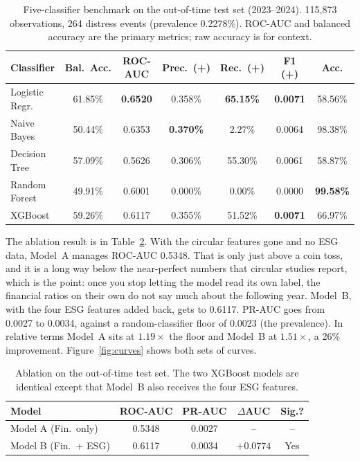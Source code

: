 \documentclass[conference]{IEEEtran}
\begin{document}
\begin{table}[t]
\caption{Five-classifier benchmark on the out-of-time test set (2023--2024).
115{,}873 observations, 264 distress events (prevalence 0.2278\%). ROC-AUC and
balanced accuracy are the primary metrics; raw accuracy is for context.}
\label{tab:bench}
\centering
\renewcommand{\arraystretch}{1.2}
\setlength{\tabcolsep}{4pt}
\begin{tabular}{lcccccc}
\toprule
Classifier & Bal.\ Acc. & ROC-AUC & Prec.\ (+) & Rec.\ (+) & F1 (+) & Acc. \\
\midrule
Logistic Regr.\ & 61.85\% & \textbf{0.6520} & 0.358\% & \textbf{65.15\%} & \textbf{0.0071} & 58.56\% \\
Naive Bayes     & 50.44\% & 0.6353 & \textbf{0.370\%} & 2.27\%  & 0.0064 & 98.38\% \\
Decision Tree   & 57.09\% & 0.5626 & 0.306\% & 55.30\% & 0.0061 & 58.87\% \\
Random Forest   & 49.91\% & 0.6001 & 0.000\% & 0.00\%  & 0.0000 & \textbf{99.58\%} \\
XGBoost         & 59.26\% & 0.6117 & 0.355\% & 51.52\% & \textbf{0.0071} & 66.97\% \\
\bottomrule
\end{tabular}
\end{table}

The ablation result is in Table~\ref{tab:ablation}. With the circular features
gone and no ESG data, Model~A manages ROC-AUC 0.5348. That is only just above a
coin toss, and it is a long way below the near-perfect numbers that circular
studies report, which is the point: once you stop letting the model read its own
label, the financial ratios on their own do not say much about the following
year. Model~B, with the four ESG features added back, gets to 0.6117. PR-AUC goes
from 0.0027 to 0.0034, against a random-classifier floor of 0.0023 (the
prevalence). In relative terms Model~A sits at $1.19\times$ the floor and
Model~B at $1.51\times$, a 26\% improvement. Figure~\ref{fig:curves} shows both
sets of curves.

\begin{table}[t]
\caption{Ablation on the out-of-time test set. The two XGBoost models are
identical except that Model~B also receives the four ESG features.}
\label{tab:ablation}
\centering
\renewcommand{\arraystretch}{1.2}
\begin{tabular}{lcccc}
\toprule
Model & ROC-AUC & PR-AUC & $\Delta$AUC & Sig.? \\
\midrule
Model A (Fin.\ only)   & 0.5348 & 0.0027 & --      & --  \\
Model B (Fin.\ + ESG)  & 0.6117 & 0.0034 & $+0.0774$ & Yes \\
\bottomrule
\end{tabular}
\end{table}
\end{document}
